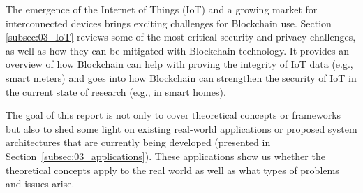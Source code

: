 The emergence of the Internet of Things (IoT) and a growing market for interconnected devices brings exciting challenges for Blockchain use. Section \ref{subsec:03_IoT} reviews some of the most critical security and privacy challenges, as well as how they can be mitigated with Blockchain technology. It provides an overview of how Blockchain can help with proving the integrity of IoT data (e.g., smart meters) and goes into how Blockchain can strengthen the security of IoT in the current state of research (e.g., in smart homes).

The goal of this report is not only to cover theoretical concepts or frameworks but also to shed some light on existing real-world applications or proposed system architectures that are currently being developed (presented in Section~\ref{subsec:03_applications}). These applications show us whether the theoretical concepts apply to the real world as well as what types of problems and issues arise.
